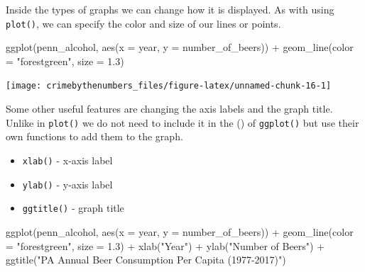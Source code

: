 \documentclass[
]{krantz}
\makeatletter
\newenvironment{Shaded}{\begin{snugshade}}{\end{snugshade}}
\newcommand{\AttributeTok}[1]{\textcolor[rgb]{0.61,0.61,0.61}{#1}}
\newcommand{\FloatTok}[1]{\textcolor[rgb]{0.06,0.06,0.06}{#1}}
\newcommand{\FunctionTok}[1]{\textcolor[rgb]{0,0,0}{#1}}
\newcommand{\NormalTok}[1]{#1}
\newcommand{\SpecialCharTok}[1]{\textcolor[rgb]{0,0,0}{#1}}
\newcommand{\StringTok}[1]{\textcolor[rgb]{0.5,0.5,0.5}{#1}}
\providecommand{\tightlist}{%
  \setlength{\itemsep}{0pt}\setlength{\parskip}{0pt}}
\newenvironment{kframe}{%
\medskip{}
\setlength{\fboxsep}{.8em}
 \def\at@end@of@kframe{}%
 \ifinner\ifhmode%
  \def\at@end@of@kframe{\end{minipage}}%
  \begin{minipage}{\columnwidth}%
 \fi\fi%
 \def\FrameCommand##1{\hskip\@totalleftmargin \hskip-\fboxsep
 \colorbox{shadecolor}{##1}\hskip-\fboxsep
     \hskip-\linewidth \hskip-\@totalleftmargin \hskip\columnwidth}%
 \MakeFramed {\advance\hsize-\width
   \@totalleftmargin\z@ \linewidth\hsize
   \@setminipage}}%
 {\par\unskip\endMakeFramed%
 \at@end@of@kframe}
\renewenvironment{Shaded}{\begin{kframe}}{\end{kframe}}
\makeatother
\begin{document}
Inside the types of graphs we can change how it is displayed. As with using \texttt{plot()}, we can specify the color and size of our lines or points.

\begin{Shaded}
\begin{Highlighting}[]
\FunctionTok{ggplot}\NormalTok{(penn\_alcohol, }\FunctionTok{aes}\NormalTok{(}\AttributeTok{x =}\NormalTok{ year, }\AttributeTok{y =}\NormalTok{ number\_of\_beers)) }\SpecialCharTok{+}
  \FunctionTok{geom\_line}\NormalTok{(}\AttributeTok{color =} \StringTok{"forestgreen"}\NormalTok{, }\AttributeTok{size =} \FloatTok{1.3}\NormalTok{)}
\end{Highlighting}
\end{Shaded}

\begin{center}\texttt{[image: crimebythenumbers\_files/figure-latex/unnamed-chunk-16-1]} \end{center}

Some other useful features are changing the axis labels and the graph title. Unlike in \texttt{plot()} we do not need to include it in the () of \texttt{ggplot()} but use their own functions to add them to the graph.

\begin{itemize}
\tightlist
\item
  \texttt{xlab()} - x-axis label
\item
  \texttt{ylab()} - y-axis label
\item
  \texttt{ggtitle()} - graph title
\end{itemize}

\begin{Shaded}
\begin{Highlighting}[]
\FunctionTok{ggplot}\NormalTok{(penn\_alcohol, }\FunctionTok{aes}\NormalTok{(}\AttributeTok{x =}\NormalTok{ year, }\AttributeTok{y =}\NormalTok{ number\_of\_beers)) }\SpecialCharTok{+}
  \FunctionTok{geom\_line}\NormalTok{(}\AttributeTok{color =} \StringTok{"forestgreen"}\NormalTok{, }\AttributeTok{size =} \FloatTok{1.3}\NormalTok{) }\SpecialCharTok{+}
  \FunctionTok{xlab}\NormalTok{(}\StringTok{"Year"}\NormalTok{) }\SpecialCharTok{+}
  \FunctionTok{ylab}\NormalTok{(}\StringTok{"Number of Beers"}\NormalTok{) }\SpecialCharTok{+}
  \FunctionTok{ggtitle}\NormalTok{(}\StringTok{"PA Annual Beer Consumption Per Capita (1977{-}2017)"}\NormalTok{)}
\end{Highlighting}
\end{Shaded}
\end{document}
